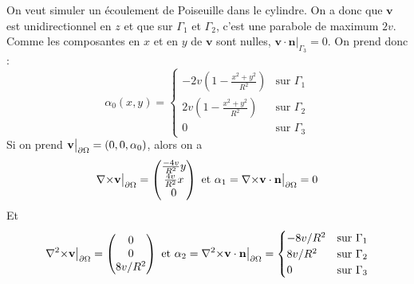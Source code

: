 On veut simuler un écoulement de Poiseuille dans le cylindre. On a donc que $\mathbf{v}$ est unidirectionnel en $z$ et que sur $\Gamma_1$ et $\Gamma_2$, c'est une parabole de maximum $2v$. Comme les composantes en $x$ et en $y$ de $\mathbf{v}$ sont nulles, $\mathbf{v}\cdot\mathbf{n}\big\rvert_{\Gamma_3}=0$. On prend donc :
\begin{equation}\label{alpha0}
 \alpha_0(x,y)= \begin{cases} -2v\left(1-\frac{x^2+y^2}{R^2}\right) &\mbox{sur } \Gamma_1\\
2v\left(1-\frac{x^2+y^2}{R^2}\right)&\mbox{sur } \Gamma_2\\
0 &\mbox{sur } \Gamma_3 \end{cases} \end{equation}
Si on prend $\mathbf{v}{\big\rvert_{\partial\Omega}}=(0,0,\alpha_0)$, alors on a 
\[ {\nabla\times}\mathbf{v}{\big\rvert_{\partial\Omega}} = \begin{pmatrix}\frac{-4v}{R^2}y\\\frac{4v}{R^2}x\\0\end{pmatrix}\mbox{ et } \alpha_1={\nabla\times}\mathbf{v}\cdot\mathbf{n}{\big\rvert_{\partial\Omega}} = 0 \]
Et
\[ {\nabla^2\times}\mathbf{v}{\big\rvert_{\partial\Omega}} = \begin{pmatrix}0\\0\\8v/R^2\end{pmatrix}\mbox{ et } \alpha_2={\nabla^2\times}\mathbf{v}\cdot\mathbf{n}{\big\rvert_{\partial\Omega}} = \begin{cases} -8v/R^2 &\mbox{sur } \Gamma_1\\
8v/R^2 &\mbox{sur } \Gamma_2\\ 0 &\mbox{sur } \Gamma_3 \end{cases} \]

